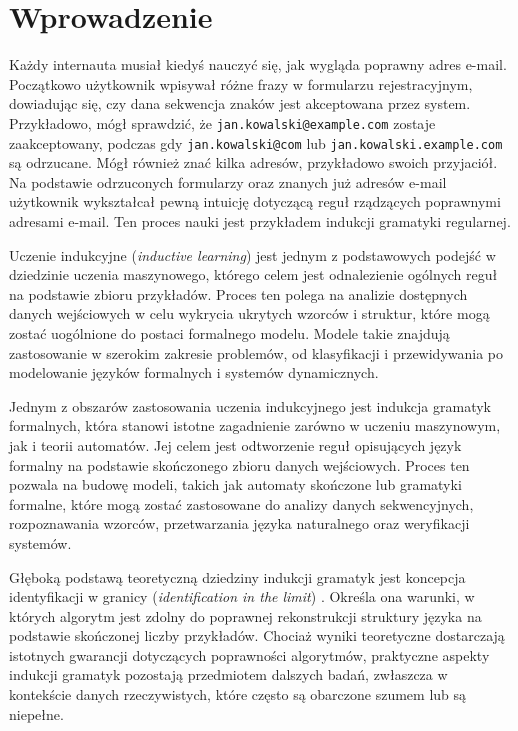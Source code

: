 \chapter{Wprowadzenie}  
\label{cha:wprowadzenie}  

Każdy internauta musiał kiedyś nauczyć się, jak wygląda poprawny adres e-mail. Początkowo użytkownik wpisywał różne frazy w formularzu rejestracyjnym, dowiadując się, czy dana sekwencja znaków jest akceptowana przez system. Przykładowo, mógł sprawdzić, że \texttt{jan.kowalski@example.com} zostaje zaakceptowany, podczas gdy \texttt{jan.kowalski@com} lub \texttt{jan.kowalski.example.com} są odrzucane. Mógł również znać kilka adresów, przykładowo swoich przyjaciół. Na podstawie odrzuconych formularzy oraz znanych już adresów e-mail użytkownik wykształcał pewną intuicję dotyczącą reguł rządzących poprawnymi adresami e-mail. Ten proces nauki jest przykładem indukcji gramatyki regularnej. 

Uczenie indukcyjne (\textit{inductive learning}) jest jednym z podstawowych podejść w dziedzinie uczenia maszynowego, którego celem jest odnalezienie ogólnych reguł na podstawie zbioru przykładów. Proces ten polega na analizie dostępnych danych wejściowych w celu wykrycia ukrytych wzorców i struktur, które mogą zostać uogólnione do postaci formalnego modelu. Modele takie znajdują zastosowanie w szerokim zakresie problemów, od klasyfikacji i przewidywania po modelowanie języków formalnych i systemów dynamicznych.  

Jednym z obszarów zastosowania uczenia indukcyjnego jest indukcja gramatyk formalnych, która stanowi istotne zagadnienie zarówno w uczeniu maszynowym, jak i teorii automatów. Jej celem jest odtworzenie reguł opisujących język formalny na podstawie skończonego zbioru danych wejściowych. Proces ten pozwala na budowę modeli, takich jak automaty skończone lub gramatyki formalne, które mogą zostać zastosowane do analizy danych sekwencyjnych, rozpoznawania wzorców, przetwarzania języka naturalnego oraz weryfikacji systemów.  

Głęboką podstawą teoretyczną dziedziny indukcji gramatyk jest koncepcja identyfikacji w granicy (\textit{identification in the limit}) \cite{GOLD1967447}. Określa ona warunki, w których algorytm jest zdolny do poprawnej rekonstrukcji struktury języka na podstawie skończonej liczby przykładów. Chociaż wyniki teoretyczne dostarczają istotnych gwarancji dotyczących poprawności algorytmów, praktyczne aspekty indukcji gramatyk pozostają przedmiotem dalszych badań, zwłaszcza w kontekście danych rzeczywistych, które często są obarczone szumem lub są niepełne.

